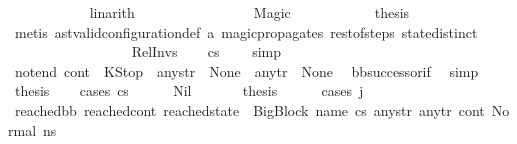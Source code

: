 \begin{isabellebody}
\ \ \ \ \ \ \ \ \ \ \isamarkupfalse%
\ linarith\isanewline
\ \ \ \ \ \ \isamarkupfalse%
\isanewline
\ \ \ \ \ \ \ \ \isamarkupfalse%
\ Magic\isanewline
\ \ \ \ \ \ \ \ \isamarkupfalse%
\ \isamarkupfalse%
\ {\isacharquery}{\kern0pt}thesis\ \isamarkupfalse%
\ {\isacharparenleft}{\kern0pt}metis\ ast{\isacharunderscore}{\kern0pt}valid{\isacharunderscore}{\kern0pt}configuration{\isacharunderscore}{\kern0pt}def\ a{}\ magic{\isacharunderscore}{\kern0pt}propagates\ rest{\isacharunderscore}{\kern0pt}of{\isacharunderscore}{\kern0pt}steps\ state{\isachardot}{\kern0pt}distinct{\isacharparenleft}{\kern0pt}{}{\isacharparenright}{\kern0pt}{\isacharparenright}{\kern0pt}\isanewline
\ \ \ \ \ \ \isamarkupfalse%
\isanewline
\ \ \ \ \isamarkupfalse%
\isanewline
\ \ \isamarkupfalse%
\isanewline
{}\isamarkupfalse%
\isanewline
\ \ \isamarkupfalse%
\ Rel{\isacharunderscore}{\kern0pt}Invs\isanewline
\ \ \isamarkupfalse%
\ {\isachardoublequoteopen}cs{}\ {\isacharequal}{\kern0pt}\ {\isacharbrackleft}{\kern0pt}{\isacharbrackright}{\kern0pt}{\isachardoublequoteclose}\ \isamarkupfalse%
\ simp\isanewline
\ \ \isamarkupfalse%
\ not{\isacharunderscore}{\kern0pt}end{\isacharcolon}{\kern0pt}\ {\isachardoublequoteopen}{\isacharparenleft}{\kern0pt}cont{}\ {\isasymnoteq}\ KStop{\isacharparenright}{\kern0pt}\ {\isasymor}\ any{\isacharunderscore}{\kern0pt}str\ {\isasymnoteq}\ None\ {\isasymor}\ any{\isacharunderscore}{\kern0pt}tr\ {\isasymnoteq}\ None{\isachardoublequoteclose}\ \isamarkupfalse%
\ bb{\isacharunderscore}{\kern0pt}successor{\isacharunderscore}{\kern0pt}if\ \isamarkupfalse%
\ simp\isanewline
\ \ \isamarkupfalse%
\ {\isacharquery}{\kern0pt}thesis\isanewline
\ \ \isamarkupfalse%
\ {\isacharparenleft}{\kern0pt}cases\ cs{}{\isacharparenright}{\kern0pt}\isanewline
\ \ \ \ \isamarkupfalse%
\ Nil\ \isanewline
\ \ \ \ \isamarkupfalse%
\ {\isacharquery}{\kern0pt}thesis\isanewline
\ \ \ \ \isamarkupfalse%
\ {\isacharparenleft}{\kern0pt}cases\ j{\isacharparenright}{\kern0pt}\isanewline
\ \ \ \ \ \ \isamarkupfalse%
\ {}\isanewline
\ \ \ \ \ \ \isamarkupfalse%
\ {\isachardoublequoteopen}{\isacharparenleft}{\kern0pt}reached{\isacharunderscore}{\kern0pt}bb{\isacharcomma}{\kern0pt}\ reached{\isacharunderscore}{\kern0pt}cont{\isacharcomma}{\kern0pt}\ reached{\isacharunderscore}{\kern0pt}state{\isacharparenright}{\kern0pt}\ {\isacharequal}{\kern0pt}\ {\isacharparenleft}{\kern0pt}{\isacharparenleft}{\kern0pt}BigBlock\ name\ cs{}\ any{\isacharunderscore}{\kern0pt}str\ any{\isacharunderscore}{\kern0pt}tr{\isacharparenright}{\kern0pt}{\isacharcomma}{\kern0pt}\ cont{}{\isacharcomma}{\kern0pt}\ {\isacharparenleft}{\kern0pt}Normal\ ns{}{\isacharparenright}{\kern0pt}{\isacharparenright}{\kern0pt}{\isachardoublequoteclose}\ \isamarkupfalse%

\end{isabellebody}

